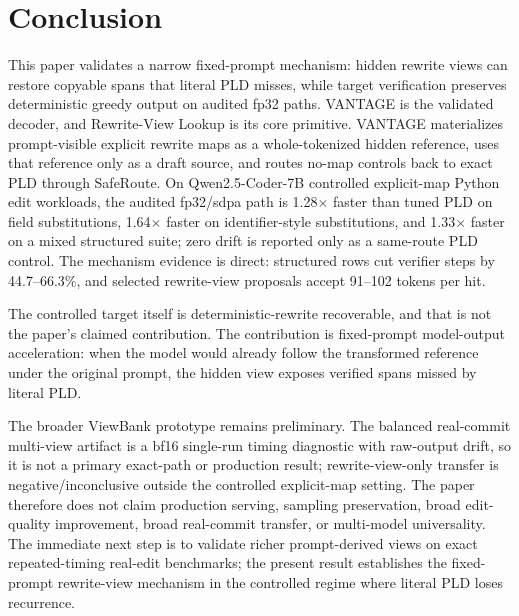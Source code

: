 \documentclass[11pt,a4paper]{article}
\begin{document}
\section{Conclusion}

This paper validates a narrow fixed-prompt mechanism: hidden rewrite views can
restore copyable spans that literal PLD misses, while target verification
preserves deterministic greedy output on audited fp32 paths. VANTAGE is the
validated decoder, and Rewrite-View Lookup is its core primitive. VANTAGE
materializes prompt-visible explicit rewrite maps as a whole-tokenized hidden
reference, uses that reference only as a draft source, and routes no-map
controls back to exact PLD through SafeRoute. On Qwen2.5-Coder-7B controlled
explicit-map Python edit workloads, the audited
fp32/sdpa path is 1.28$\times$ faster than tuned PLD on field substitutions,
1.64$\times$ faster on identifier-style substitutions, and 1.33$\times$ faster
on a mixed structured suite; zero drift is reported only as a same-route PLD
control. The mechanism evidence is direct: structured rows cut verifier steps
by 44.7--66.3\%, and selected rewrite-view proposals accept 91--102 tokens
per hit.

The controlled target itself is deterministic-rewrite recoverable, and that is
not the paper's claimed contribution. The contribution is fixed-prompt
model-output acceleration: when the model would already follow the transformed
reference under the original prompt, the hidden view exposes verified spans
missed by literal PLD.

The broader ViewBank prototype remains preliminary. The balanced real-commit
multi-view artifact is a bf16 single-run timing diagnostic with raw-output
drift, so it is not a primary exact-path or production result; rewrite-view-only
transfer is negative/inconclusive outside the controlled explicit-map
setting. The paper therefore does not claim production serving, sampling
preservation, broad edit-quality improvement, broad real-commit transfer, or
multi-model universality. The immediate next step is to validate richer
prompt-derived views on exact repeated-timing real-edit benchmarks; the present
result establishes the fixed-prompt rewrite-view mechanism in the controlled
regime where literal PLD loses recurrence.
\end{document}
